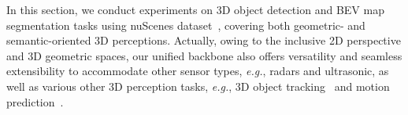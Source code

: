\documentclass[10pt,twocolumn,letterpaper]{article}
\begin{document}
\begin{table}[t]
\centering
{}
\vspace{-4pt}
\caption{Effect of camera image space fusion, 3D lidar geometric space fusion and BEV unifier on nuScenes (val). 1$^{st}$ row is the lidar-only variant of our model. Camera~(C), LiDAR~(L).}
\label{tab:fuse}
\vspace{-6pt}
\end{table}
\begin{table}[h]
\centering
{}
\vspace{-0pt}
\caption{Effect of parallel intra-modal transformer block.}
\label{tab:singlemodal}
\vspace{-16pt}
\end{table}
In this section, we conduct experiments on 3D object detection and BEV map segmentation tasks using nuScenes dataset~\cite{caesar2020nuscenes}, covering both geometric- and semantic-oriented 3D perceptions. Actually, owing to the inclusive 2D perspective and 3D geometric spaces, our unified backbone also offers versatility and seamless extensibility to accommodate other sensor types, \textit{e.g.}, radars and ultrasonic, as well as various other 3D perception tasks, \emph{e.g.}, 3D object tracking~\cite{yin2021cvpr} and motion prediction~\cite{ettinger2021large}.
\end{document}
